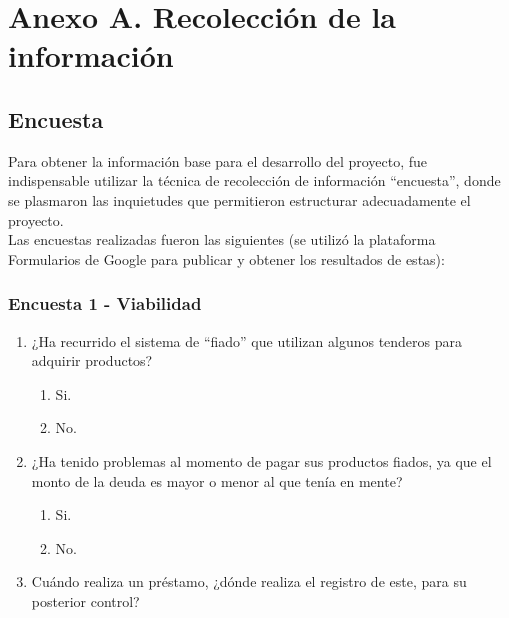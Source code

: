 \section*{Anexo A. Recolección de la información}

	\subsection*{Encuesta}
	
	{Para obtener la información base para el desarrollo del proyecto, fue indispensable utilizar la técnica de recolección de información “encuesta”, donde se plasmaron las inquietudes que permitieron estructurar adecuadamente el proyecto.\\
		
	Las encuestas realizadas fueron las siguientes (se utilizó la plataforma Formularios de Google para publicar y obtener los resultados de estas):
	
	
		\subsubsection*{Encuesta 1 - Viabilidad}
		
			\begin{enumerate}
				
				\item ¿Ha recurrido el sistema de “fiado” que utilizan algunos tenderos para adquirir productos?
				
					\begin{enumerate}
						\item Si.
						\item No.
					\end{enumerate}
				
				\item ¿Ha tenido problemas al momento de pagar sus productos fiados, ya que el monto de la deuda es mayor o menor al que tenía en mente?
				
					\begin{enumerate}
						\item Si.
						\item No.
					\end{enumerate}	
				
				\item Cuándo realiza un préstamo, ¿dónde realiza el registro de este, para su posterior control?
					

\end{enumerate}}
